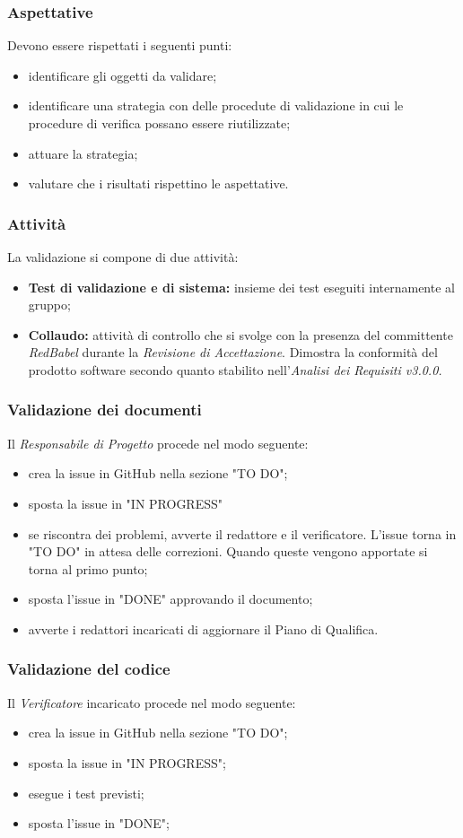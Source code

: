 \subsubsection{Aspettative}
Devono essere rispettati i seguenti punti:
\begin{itemize}
    \item identificare gli oggetti da validare;
    \item identificare una strategia con delle procedute di validazione in cui le procedure di verifica possano essere riutilizzate;
    \item attuare la strategia;
    \item valutare che i risultati rispettino le aspettative.
\end{itemize}
\subsubsection{Attività}
La validazione si compone di due attività:
\begin{itemize}
    \item \textbf{Test di validazione e di sistema:} insieme dei test eseguiti internamente al gruppo;
    \item \textbf{Collaudo:} attività di controllo che si svolge con la presenza del committente \textit{RedBabel} durante
          la \textit{Revisione di Accettazione}. Dimostra la conformità del prodotto software secondo quanto stabilito nell'\textit{Analisi dei Requisiti v3.0.0.}
\end{itemize}
\subsubsection{Validazione dei documenti}
Il \textit{Responsabile di Progetto} procede nel modo seguente:
\begin{itemize}
    \item crea la issue in GitHub nella sezione "TO DO";
    \item sposta la issue in "IN PROGRESS"
    \item se riscontra dei problemi, avverte il redattore e il verificatore. L'issue torna in "TO DO" in attesa delle correzioni. Quando queste vengono apportate
          si torna al primo punto;
    \item sposta l'issue in "DONE" approvando il documento;
    \item avverte i redattori incaricati di aggiornare il Piano di Qualifica.
\end{itemize}
\subsubsection{Validazione del codice}
Il \textit{Verificatore} incaricato procede nel modo seguente:
\begin{itemize}
    \item crea la issue in GitHub nella sezione "TO DO";
    \item sposta la issue in "IN PROGRESS";
    \item esegue i test previsti;
    \item sposta l'issue in "DONE";
\end{itemize}
